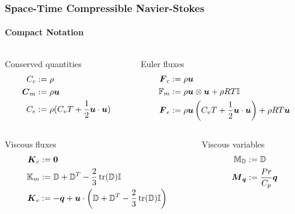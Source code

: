 \documentclass[18pt,xcolor=table]{beamer}
\begin{document}
\begin{frame}[t]
\frametitle{Space-Time Compressible Navier-Stokes}
\framesubtitle{Compact Notation}
\begin{columns}[t]
\begin{column}{0.5\textwidth}
Conserved quantities
\vspace{-2ex}
\begin{align*}
C_c&:=\rho\\
\boldsymbol C_m&:=\rho\boldsymbol u\\
C_e&:=\rho(C_v T+\frac{1}{2}\boldsymbol u\cdot\boldsymbol u)\\
\end{align*}
\end{column} 
\begin{column}{0.5\textwidth}
Euler fluxes 
\vspace{-2ex}
\begin{align*}
\boldsymbol F_c&:=\rho\boldsymbol u\\
\mathbb{F}_m&:=\rho\boldsymbol u\otimes\boldsymbol u+\rho RT\mathbb{I}\\
\boldsymbol F_e&:=\rho\boldsymbol u\left( C_v T+\frac{1}{2}\boldsymbol u\cdot\boldsymbol u \right)+\rho RT\boldsymbol u\\
\end{align*}
\end{column} 
\end{columns}
\begin{columns}[t]
\begin{column}{0.3\textwidth}
Viscous fluxes 
\vspace{-2ex}
\begin{align*}
\boldsymbol K_c&:=\boldsymbol 0\\
\mathbb{K}_m&:=\mathbb{D}+\mathbb{D}^T-\frac{2}{3}\operatorname*{tr}(\mathbb{D})\mathbb{I}\\
\boldsymbol K_e&:=-\boldsymbol q+\boldsymbol u\cdot\left( \mathbb{D}+\mathbb{D}^T-\frac{2}{3}\operatorname*{tr}(\mathbb{D})\mathbb{I} \right)\\
\end{align*}
\end{column} 
\begin{column}{0.3\textwidth}
Viscous variables
\vspace{-2ex}
\begin{align*}
\bbM_{\bbD}&:=\bbD\\
\bfM_{\bfq}&:=\frac{Pr}{C_p}\bfq\\

\end{align*}
\end{column}
\end{columns}
\end{frame}
\end{document}
